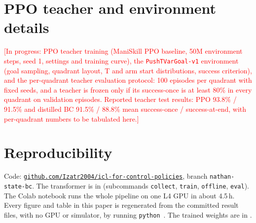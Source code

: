 \documentclass[10pt]{article}
\providecommand{\inprogress}[1]{\textcolor{red}{[In progress: #1]}}
\begin{document}


\section{PPO teacher and environment details}
\label{sec:ppo}
\inprogress{PPO teacher training (ManiSkill PPO baseline, 50M environment steps, seed 1, settings and training curve), the
\texttt{PushTVarGoal-v1} environment (goal sampling, quadrant layout, T and arm start distributions, success criterion), and the
per-quadrant teacher evaluation protocol: 100 episodes per quadrant with fixed seeds, and a teacher is frozen only if its
success-once is at least 80\% in every quadrant on validation episodes. Reported teacher test results: PPO 93.8\% / 91.5\% and
distilled BC 91.5\% / 88.8\% mean success-once / success-at-end, with per-quadrant numbers to be tabulated here.}

\section{Reproducibility}
\label{app:repro}
Code: \href{https://github.com/Izatr2004/icl-for-control-policies}{\texttt{github.com/Izatr2004/icl-for-control-policies}},
branch \texttt{nathan-state-bc}. %
The transformer is in  (subcommands \texttt{collect}, \texttt{train}, \texttt{offline},
\texttt{eval}). The Colab notebook  runs the whole pipeline on one L4 GPU
in about 4.5\,h. Every figure and table in this paper is regenerated from the committed result files, with no GPU or simulator, by
running \texttt{python}~. The trained weights are in .
\end{document}
